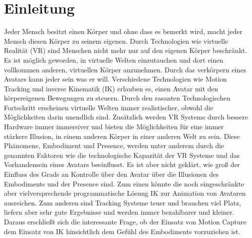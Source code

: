 \chapter{Einleitung}

Jeder Mensch besitzt einen Körper und ohne dass es bemerkt wird, macht jeder Mensch diesen Körper zu seinem eigenen. Durch Technologien wie virtuelle Realität (VR) sind Menschen nicht mehr nur auf den eigenen Körper beschränkt. Es ist möglich geworden, in virtuelle Welten einzutauchen und dort einen vollkommen anderen, virtuellen Körper anzunehmen. Durch das verkörpern eines Avatars kann jeder sein was er will. Verschiedene Technologien wie Motion Tracking und inverse Kinematik (IK) erlauben es,  einen Avatar mit den körpereigenen Bewegungen zu steuern. 
Durch den rasanten Technologischen Fortschritt erscheinen virtuelle Welten immer realistischer, obwohl die Möglichkeiten darin unendlich sind. Zusätzlich werden VR Systeme durch bessere Hardware immer immersiver und bieten die Möglichkeiten für eine immer stärkere Illusion, in einem anderen Körper in einer anderen Welt zu sein. Diese Phänomene, Embodiment und Presence, werden unter anderem durch die genannten Faktoren wie die technologische Kapazität der VR Systeme und das Vorhandensein eines Avatars beeinflusst. Es ist aber nicht geklärt, wie groß der Einfluss des Grads an Kontrolle über den Avatar über die Illusionen des Embodiments und der Presence sind. Zum einen könnte die noch eingeschränkte aber vielversprechende programmatische Lösung IK zur Animation von Avataren ausreichen. Zum anderen sind Tracking Systeme teuer und brauchen viel Platz, liefern aber sehr gute Ergebnisse und werden immer bezahlbarer und kleiner. Daraus erschließt sich die interessante Frage, ob der Einsatz von Motion Capture dem Einsatz von IK hinsichtlich dem Gefühl des Embodiments vorzuziehen ist.


